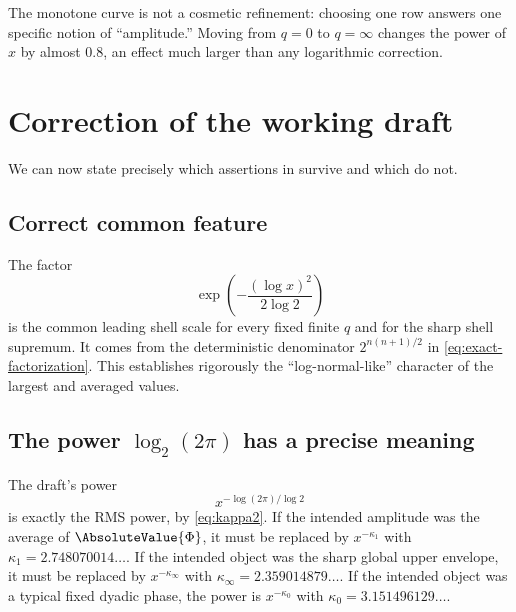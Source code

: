 \documentclass[11pt,oneside]{article}
\theoremstyle{definition}
\theoremstyle{remark}
\newcommand{\Phiup}{\Phi}
\begin{document}
\begin{center}
\end{center}

The monotone curve is not a cosmetic refinement: choosing one row answers one specific
notion of ``amplitude.''  Moving from $q=0$ to $q=\infty$ changes the power of $x$ by almost
$0.8$, an effect much larger than any logarithmic correction.

\section{Correction of the working draft}
\label{sec:draft-correction}

We can now state precisely which assertions in \cite{decay-draft} survive and which do not.

\subsection{Correct common feature}

The factor
\[
 \exp\!\left(-\frac{(\log x)^2}{2\log2}\right)
\]
is the common leading shell scale for every fixed finite $q$ and for the sharp shell
supremum.  It comes from the deterministic denominator
$2^{n(n+1)/2}$ in \eqref{eq:exact-factorization}.  This establishes rigorously the
``log-normal-like'' character of the largest and averaged values.

\subsection{The power $\log_2(2\pi)$ has a precise meaning}

The draft's power
\[
 x^{-\log(2\pi)/\log2}
\]
is exactly the RMS power, by \eqref{eq:kappa2}.  If the intended amplitude was the average
of $\AbsoluteValue{\Phiup}$, it must be replaced by $x^{-\kappa_1}$ with
$\kappa_1=2.748070014\ldots$.  If the intended object was the sharp global upper envelope,
it must be replaced by $x^{-\kappa_\infty}$ with
$\kappa_\infty=2.359014879\ldots$.  If the intended object was a typical fixed dyadic
phase, the power is $x^{-\kappa_0}$ with
$\kappa_0=3.151496129\ldots$.
\end{document}
